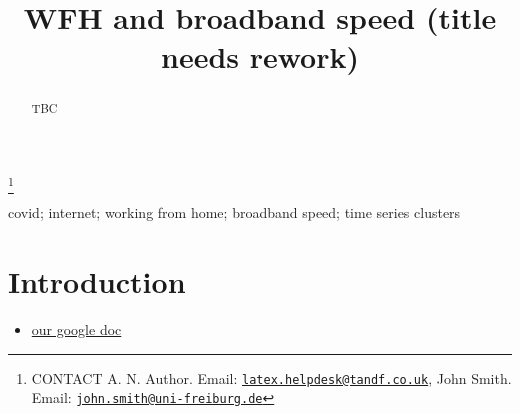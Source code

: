 \documentclass[]{interact}
\theoremstyle{plain}%
\theoremstyle{definition}
\theoremstyle{remark}
\def\tightlist{}
\begin{document}

\title{WFH and broadband speed (title needs rework)}


\author{
}

\thanks{CONTACT A. N. Author. Email: \href{mailto:latex.helpdesk@tandf.co.uk}{\nolinkurl{latex.helpdesk@tandf.co.uk}}, John Smith. Email: \href{mailto:john.smith@uni-freiburg.de}{\nolinkurl{john.smith@uni-freiburg.de}}}

\maketitle

\begin{abstract}
TBC
\end{abstract}

\begin{keywords}
covid; internet; working from home; broadband speed; time series
clusters
\end{keywords}

\hypertarget{introduction}{%
\section{Introduction}\label{introduction}}

\begin{itemize}
\tightlist
\item
  \href{https://docs.google.com/document/d/1PWjkmgzWGYKR9wFogKYw7l-8mZLoORt593x-Tu-f2-M/edit\#heading=h.i5om1o8wpcd9}{our
  google doc}
\end{itemize}
\end{document}
